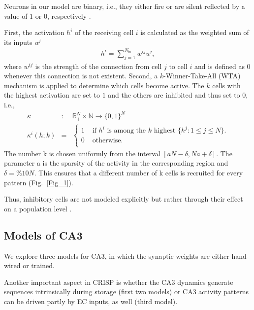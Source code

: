 \documentclass[utf8]{frontiersSCNS} %
\begin{document}
Neurons in our model are binary, i.e., they either fire or are silent reflected by a value of $1$ or $0$, respectively \cite{fontanari1995model}.

First, the activation $h^i$ of the receiving cell $i$ is calculated as the weighted sum of its inputs $u^j$
\begin{align}
	\label{activation}
	h^i = \sum_{j=1}^{N_\mathrm{in}} w^{ij}u^j,
\end{align}  
where $w^{ij}$ is the strength of the connection from cell $j$ to cell $i$ and is defined as $0$ whenever this connection is not existent. Second, a $k$-Winner-Take-All (WTA) mechanism is applied to determine which cells become active. The $k$ cells with the highest activation are set to $1$ and the others are inhibited and thus set to $0$, i.e.,
\begin{eqnarray}
\label{eq:kWTA}
	\kappa &:& \mathbb{R}_+^N \times \mathbb{N} \to \{0,1\}^N \\
	\kappa^i (h;k) &=& \left \{ \begin{array}{ll}
			1 &\text{ if $h^i$ is among the $k$ highest } \{ h^j:1\le j\le N \}. \\
			0 &\text{ otherwise}.\\
	\end{array} \right.
	\label{eq:binary}
\end{eqnarray}
The number k is chosen uniformly from the interval $ [aN - \delta , Na + \delta ]$. The parameter a is the sparsity of the activity in the corresponding region and $\delta = \% 10 N$. This ensures that a different number of k cells is recruited for every pattern (Fig.~\ref{Fig_1}). 

Thus, inhibitory cells are not modeled explicitly but rather through their effect on a population level \cite{renno2010mechanism, roudi2008representing, moustafa2009neurocomputational, appleby2011role, monaco2011modular}.


\subsection{Models of CA3}
\label{ca3:models}


We explore three models for CA3, in which the synaptic weights are either hand-wired or trained. 

Another important aspect in CRISP is whether the CA3 dynamics generate sequences intrinsically during storage (first two models) or CA3 activity patterns can be driven partly by EC inputs, as well (third model). 
\end{document}
